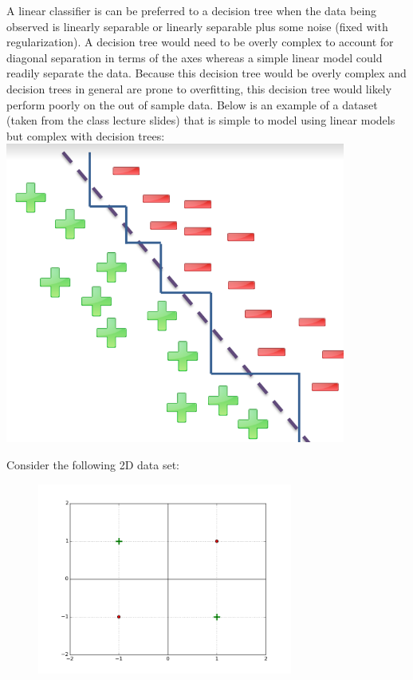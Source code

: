 \begin{solution}
  A linear classifier is can be preferred to a decision tree when the data being observed is linearly separable or linearly separable plus some noise (fixed with regularization). A decision tree would need to be overly complex to account for diagonal separation in terms of the axes whereas a simple linear model could readily separate the data. Because this decision tree would be overly complex and decision trees in general are prone to overfitting, this decision tree would likely perform poorly on the out of sample data. Below is an example of a dataset (taken from the class lecture slides) that is simple to model using linear models but complex with decision trees: \\
  \includegraphics{images/P1_b.png} \\
\end{solution}

\problem[15]
Consider the following 2D data set:
\begin{figure}[H]
    \begin{center}
    \includegraphics[width=3.3in]{plots/3C.png}
    \end{center}
    \end{figure}

